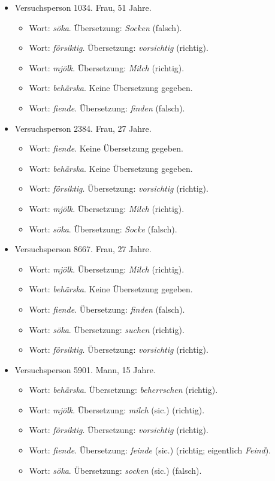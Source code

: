 \documentclass[oneside, 10pt]{book}\usepackage[]{graphicx}\usepackage[]{xcolor}
\begin{document}
\begin{itemize}
\item Versuchsperson 1034. Frau, 51 Jahre.
\begin{itemize}
\item Wort: \textit{söka}. Übersetzung: \textit{Socken} (falsch).
\item Wort: \textit{försiktig}. Übersetzung: \textit{vorsichtig} (richtig).
\item Wort: \textit{mjölk}. Übersetzung: \textit{Milch} (richtig).
\item Wort: \textit{behärska}. Keine Übersetzung gegeben.
\item Wort: \textit{fiende}. Übersetzung: \textit{finden} (falsch).
\end{itemize}

\item Versuchsperson 2384. Frau, 27 Jahre.
\begin{itemize}
\item Wort: \textit{fiende}. Keine Übersetzung gegeben.
\item Wort: \textit{behärska}. Keine Übersetzung gegeben.
\item Wort: \textit{försiktig}. Übersetzung: \textit{vorsichtig} (richtig).
\item Wort: \textit{mjölk}. Übersetzung: \textit{Milch} (richtig).
\item Wort: \textit{söka}. Übersetzung: \textit{Socke} (falsch).
\end{itemize}

\item Versuchsperson 8667. Frau, 27 Jahre.
\begin{itemize}
\item Wort: \textit{mjölk}. Übersetzung: \textit{Milch} (richtig).
\item Wort: \textit{behärska}. Keine Übersetzung gegeben.
\item Wort: \textit{fiende}. Übersetzung: \textit{finden} (falsch).
\item Wort: \textit{söka}. Übersetzung: \textit{suchen} (richtig).
\item Wort: \textit{försiktig}. Übersetzung: \textit{vorsichtig} (richtig).
\end{itemize}

\item Versuchsperson 5901. Mann, 15 Jahre.
\begin{itemize}
\item Wort: \textit{behärska}. Übersetzung: \textit{beherrschen} (richtig).
\item Wort: \textit{mjölk}. Übersetzung: \textit{milch} (sic.) (richtig).
\item Wort: \textit{försiktig}. Übersetzung: \textit{vorsichtig} (richtig).
\item Wort: \textit{fiende}. Übersetzung: \textit{feinde} (sic.) (richtig; eigentlich \textit{Feind}).
\item Wort: \textit{söka}. Übersetzung: \textit{socken} (sic.) (falsch).
\end{itemize}
\end{itemize}
\end{document}
